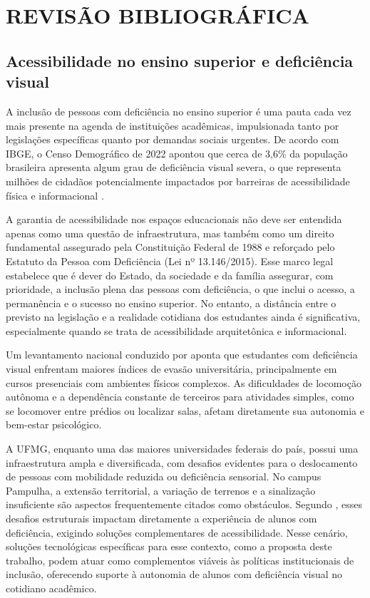 \chapter{\textbf{REVISÃO BIBLIOGRÁFICA}}
\section{Acessibilidade no ensino superior e deficiência visual}
 A inclusão de pessoas com deficiência no ensino superior é uma pauta cada vez mais presente na agenda de instituições acadêmicas, impulsionada tanto por legislações específicas quanto por demandas sociais urgentes. De acordo com IBGE, o Censo Demográfico de 2022 apontou que cerca de 3,6\% da população brasileira apresenta algum grau de deficiência visual severa, o que representa milhões de cidadãos potencialmente impactados por barreiras de acessibilidade física e informacional \cite{IBGE2023}.

 A garantia de acessibilidade nos espaços educacionais não deve ser entendida apenas como uma questão de infraestrutura, mas também como um direito fundamental assegurado pela Constituição Federal de 1988 e reforçado pelo Estatuto da Pessoa com Deficiência (Lei nº 13.146/2015). Esse marco legal estabelece que é dever do Estado, da sociedade e da família assegurar, com prioridade, a inclusão plena das pessoas com deficiência, o que inclui o acesso, a permanência e o sucesso no ensino superior. No entanto, a distância entre o previsto na legislação e a realidade cotidiana dos estudantes ainda é significativa, especialmente quando se trata de acessibilidade arquitetônica e informacional.

 Um levantamento nacional conduzido por  aponta que estudantes com deficiência visual enfrentam maiores índices de evasão universitária, principalmente em cursos presenciais com ambientes físicos complexos. As dificuldades de locomoção autônoma e a dependência constante de terceiros para atividades simples, como se locomover entre prédios ou localizar salas, afetam diretamente sua autonomia e bem-estar psicológico.

 A UFMG, enquanto uma das maiores universidades federais do país, possui uma infraestrutura ampla e diversificada, com desafios evidentes para o deslocamento de pessoas com mobilidade reduzida ou deficiência sensorial. No campus Pampulha, a extensão territorial, a variação de terrenos e a sinalização insuficiente são aspectos frequentemente citados como obstáculos. Segundo , esses desafios estruturais impactam diretamente a experiência de alunos com deficiência, exigindo soluções complementares de acessibilidade. Nesse cenário, soluções tecnológicas específicas para esse contexto, como a proposta deste trabalho, podem atuar como complementos viáveis às políticas institucionais de inclusão, oferecendo suporte à autonomia de alunos com deficiência visual no cotidiano acadêmico.


